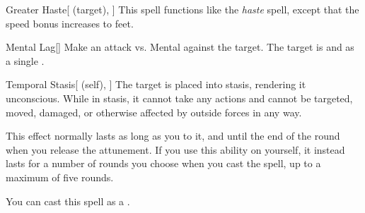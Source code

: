 \lowercase{\hypertarget{spell:Greater Haste}{}}\label{spell:Greater Haste}
\begin{attuneability}[\nth{3}]{\hypertarget{spell:Greater Haste}{Greater Haste}}[ (target), ]
This spell functions like the \textit{haste} spell, except that the speed bonus increases to  feet.
\end{attuneability}
\vspace{0.25em}



\lowercase{\hypertarget{spell:Mental Lag}{}}\label{spell:Mental Lag}
\begin{freeability}[\nth{3}]{\hypertarget{spell:Mental Lag}{Mental Lag}}[]
Make an attack vs. Mental against the target.
\hit The target is  and  as a single .
\end{freeability}
\vspace{0.25em}



\lowercase{\hypertarget{spell:Temporal Stasis}{}}\label{spell:Temporal Stasis}
\begin{attuneability}[\nth{3}]{\hypertarget{spell:Temporal Stasis}{Temporal Stasis}}[ (self), ]
The target is placed into stasis, rendering it unconscious.
While in stasis, it cannot take any actions and cannot be targeted, moved, damaged, or otherwise affected by outside forces in any way.

This effect normally lasts as long as you  to it, and until the end of the round when you release the attunement.
If you use this ability on yourself, it instead lasts for a number of rounds you choose when you cast the spell, up to a maximum of five rounds.

You can cast this spell as a .
\end{attuneability}
\vspace{0.25em}



